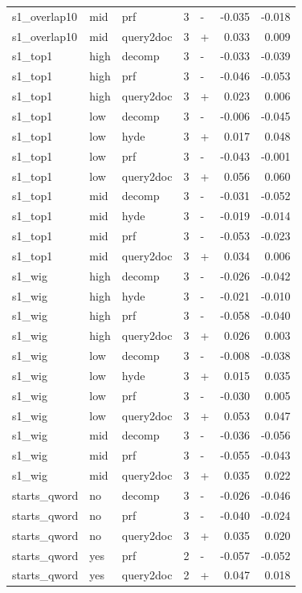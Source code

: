 \begin{table}
\begin{tabular}{lllrlrr}
s1\_overlap10 & mid & prf & 3 & - & -0.035 & -0.018 \\
s1\_overlap10 & mid & query2doc & 3 & + & 0.033 & 0.009 \\
s1\_top1 & high & decomp & 3 & - & -0.033 & -0.039 \\
s1\_top1 & high & prf & 3 & - & -0.046 & -0.053 \\
s1\_top1 & high & query2doc & 3 & + & 0.023 & 0.006 \\
s1\_top1 & low & decomp & 3 & - & -0.006 & -0.045 \\
s1\_top1 & low & hyde & 3 & + & 0.017 & 0.048 \\
s1\_top1 & low & prf & 3 & - & -0.043 & -0.001 \\
s1\_top1 & low & query2doc & 3 & + & 0.056 & 0.060 \\
s1\_top1 & mid & decomp & 3 & - & -0.031 & -0.052 \\
s1\_top1 & mid & hyde & 3 & - & -0.019 & -0.014 \\
s1\_top1 & mid & prf & 3 & - & -0.053 & -0.023 \\
s1\_top1 & mid & query2doc & 3 & + & 0.034 & 0.006 \\
s1\_wig & high & decomp & 3 & - & -0.026 & -0.042 \\
s1\_wig & high & hyde & 3 & - & -0.021 & -0.010 \\
s1\_wig & high & prf & 3 & - & -0.058 & -0.040 \\
s1\_wig & high & query2doc & 3 & + & 0.026 & 0.003 \\
s1\_wig & low & decomp & 3 & - & -0.008 & -0.038 \\
s1\_wig & low & hyde & 3 & + & 0.015 & 0.035 \\
s1\_wig & low & prf & 3 & - & -0.030 & 0.005 \\
s1\_wig & low & query2doc & 3 & + & 0.053 & 0.047 \\
s1\_wig & mid & decomp & 3 & - & -0.036 & -0.056 \\
s1\_wig & mid & prf & 3 & - & -0.055 & -0.043 \\
s1\_wig & mid & query2doc & 3 & + & 0.035 & 0.022 \\
starts\_qword & no & decomp & 3 & - & -0.026 & -0.046 \\
starts\_qword & no & prf & 3 & - & -0.040 & -0.024 \\
starts\_qword & no & query2doc & 3 & + & 0.035 & 0.020 \\
starts\_qword & yes & prf & 2 & - & -0.057 & -0.052 \\
starts\_qword & yes & query2doc & 2 & + & 0.047 & 0.018 \\
\bottomrule
\end{tabular}
\end{table}
